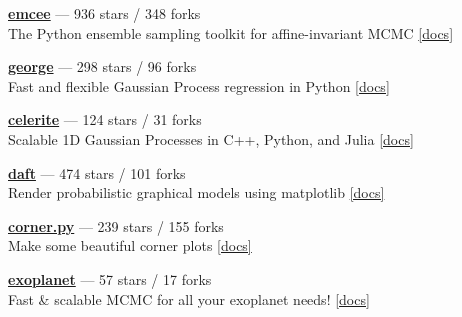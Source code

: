 \item \href{https://github.com/dfm/emcee}{{\bf emcee}} --- 936 stars / 348 forks \\
The Python ensemble sampling toolkit for affine-invariant MCMC \href{http://emcee.readthedocs.io}{[docs]}

\item \href{https://github.com/dfm/george}{{\bf george}} --- 298 stars / 96 forks \\
Fast and flexible Gaussian Process regression in Python \href{http://george.readthedocs.io}{[docs]}

\item \href{https://github.com/dfm/celerite}{{\bf celerite}} --- 124 stars / 31 forks \\
Scalable 1D Gaussian Processes in C++, Python, and Julia \href{http://celerite.rtfd.io}{[docs]}

\item \href{https://github.com/dfm/daft}{{\bf daft}} --- 474 stars / 101 forks \\
Render probabilistic graphical models using matplotlib \href{http://daft-pgm.org}{[docs]}

\item \href{https://github.com/dfm/corner.py}{{\bf corner.py}} --- 239 stars / 155 forks \\
Make some beautiful corner plots \href{http://corner.readthedocs.io}{[docs]}

\item \href{https://github.com/dfm/exoplanet}{{\bf exoplanet}} --- 57 stars / 17 forks \\
Fast {\&} scalable MCMC for all your exoplanet needs!  \href{https://exoplanet.dfm.io}{[docs]}